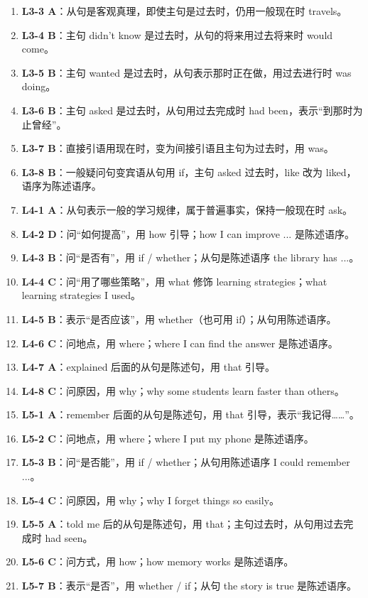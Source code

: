 \documentclass[11pt,a4paper]{ctexart}
\begin{document}
\begin{enumerate}[leftmargin=1.6em,itemsep=2pt]
\item \textbf{L3-3 A}：从句是客观真理，即使主句是过去时，仍用一般现在时 travels。
\item \textbf{L3-4 B}：主句 didn't know 是过去时，从句的将来用过去将来时 would come。
\item \textbf{L3-5 B}：主句 wanted 是过去时，从句表示那时正在做，用过去进行时 was doing。
\item \textbf{L3-6 B}：主句 asked 是过去时，从句用过去完成时 had been，表示“到那时为止曾经”。
\item \textbf{L3-7 B}：直接引语用现在时，变为间接引语且主句为过去时，用 was。
\item \textbf{L3-8 B}：一般疑问句变宾语从句用 if，主句 asked 过去时，like 改为 liked，语序为陈述语序。
\item \textbf{L4-1 A}：从句表示一般的学习规律，属于普遍事实，保持一般现在时 ask。
\item \textbf{L4-2 D}：问“如何提高”，用 how 引导；how I can improve ... 是陈述语序。
\item \textbf{L4-3 B}：问“是否有”，用 if / whether；从句是陈述语序 the library has ...。
\item \textbf{L4-4 C}：问“用了哪些策略”，用 what 修饰 learning strategies；what learning strategies I used。
\item \textbf{L4-5 B}：表示“是否应该”，用 whether（也可用 if）；从句用陈述语序。
\item \textbf{L4-6 C}：问地点，用 where；where I can find the answer 是陈述语序。
\item \textbf{L4-7 A}：explained 后面的从句是陈述句，用 that 引导。
\item \textbf{L4-8 C}：问原因，用 why；why some students learn faster than others。
\item \textbf{L5-1 A}：remember 后面的从句是陈述句，用 that 引导，表示“我记得……”。
\item \textbf{L5-2 C}：问地点，用 where；where I put my phone 是陈述语序。
\item \textbf{L5-3 B}：问“是否能”，用 if / whether；从句用陈述语序 I could remember ...。
\item \textbf{L5-4 C}：问原因，用 why；why I forget things so easily。
\item \textbf{L5-5 A}：told me 后的从句是陈述句，用 that；主句过去时，从句用过去完成时 had seen。
\item \textbf{L5-6 C}：问方式，用 how；how memory works 是陈述语序。
\item \textbf{L5-7 B}：表示“是否”，用 whether / if；从句 the story is true 是陈述语序。

\end{enumerate}
\end{document}
